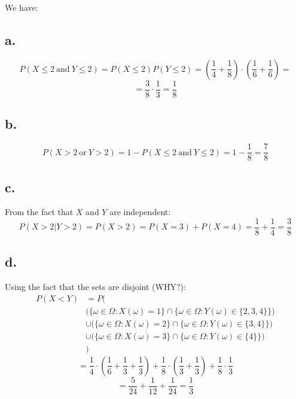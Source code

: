 \documentclass{article}
\begin{document}
We have:

\subsection*{a.}
\begin{equation*}
    P(X \leq 2 \ \mbox{and} \ Y \leq 2) = P(X \leq 2)P(Y \leq 2) = (\frac{1}{4} + \frac{1}{8}) \cdot (\frac{1}{6} + \frac{1}{6}) =
\end{equation*}
\begin{equation*}
    = \frac{3}{8} \cdot \frac{1}{3} = \frac{1}{8}
\end{equation*}

\subsection*{b.}
\begin{equation*}
    P(X > 2 \ \mbox{or} \ Y > 2) = 1 - P(X \leq 2 \ \mbox{and} \ Y \leq 2) = 1 - \frac{1}{8} = \frac{7}{8}
\end{equation*}

\subsection*{c.}
From the fact that \(X\) and \(Y\) are independent:
\begin{equation*}
    P(X>2|Y>2) = P(X>2) = P(X=3) + P(X=4) = \frac{1}{8} + \frac{1}{4} = \frac{3}{8}
\end{equation*}

\subsection*{d.}
\newpage
Using the fact that the sets are disjoint (WHY?):
\begin{equation*}
    \begin{split}
        P(X<Y) & = P\Bigg( \\
        & \Big(\{\omega \in \Omega: X(\omega) = 1 \} \cap \{\omega \in \Omega: Y(\omega) \in \{2, 3, 4\} \} \Big) \\
        & \cup \Big(\{\omega \in \Omega: X(\omega) = 2 \} \cap \{\omega \in \Omega: Y(\omega) \in \{3, 4\} \}\Big) \\
        & \cup \Big(\{\omega \in \Omega: X(\omega) = 3 \} \cap \{\omega \in \Omega: Y(\omega) \in \{4\} \}\Big) \\
        & \Bigg)
    \end{split}
\end{equation*}
\begin{equation*}
    = \frac{1}{4} \cdot (\frac{1}{6} + \frac{1}{3} + \frac{1}{3}) + \frac{1}{8} \cdot (\frac{1}{3} + \frac{1}{3}) + \frac{1}{8} \cdot \frac{1}{3}
\end{equation*}
\begin{equation*}
    = \frac{5}{24} + \frac{1}{12} + \frac{1}{24} = \frac{1}{3}
\end{equation*}
\end{document}
